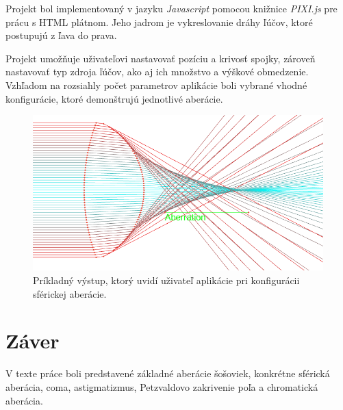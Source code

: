 Projekt bol implementovaný v jazyku \textit{Javascript} pomocou knižnice \textit{PIXI.js} pre prácu
s HTML plátnom. Jeho jadrom je vykreslovanie dráhy ľúčov, ktoré postupujú z ľava do prava. 

Projekt umožňuje uživateľovi nastavovať pozíciu a krivosť spojky, zároveň nastavovať typ zdroja 
ľúčov, ako aj ich množstvo a výškové obmedzenie. Vzhľadom na rozsiahly počet parametrov aplikácie
boli vybrané vhodné konfigurácie, ktoré demonštrujú jednotlivé aberácie.

\begin{figure}
\includegraphics[scale=0.4]{obrazky-figures/application.png}
    \centering \caption{Príkladný výstup, ktorý uvidí uživateľ aplikácie pri konfigurácii sférickej aberácie.}
\end{figure}

\section{Záver}
V texte práce boli predstavené základné aberácie šošoviek, konkrétne sférická aberácia, coma,
astigmatizmus, Petzvaldovo zakrivenie poľa a chromatická aberácia.




